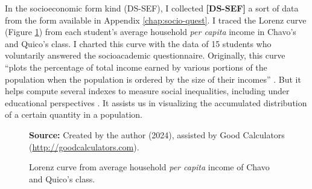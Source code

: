 In the socioeconomic form kind (\acrfull{DS-SEF}), I collected \textbf{[DS-SEF]} a sort of data from the form available in Appendix \ref{chap:socio-quest}. I traced the Lorenz curve (Figure \ref{fig:lorenz-curve-classroom}) from each student's average household \textit{per capita} income in Chavo's and Quico’s class. I charted this curve with the data of 15 students who voluntarily answered the socioacademic questionnaire. Originally, this curve “plots the percentage of total income earned by various portions of the population when the population is ordered by the size of their incomes” \cite{gastwirth:1971}. But it helps compute several indexes to measure social inequalities, including under educational perspectives \cite{thomas:2003}. It assists us in visualizing the accumulated distribution of a certain quantity in a population.

\begin{figure}[ht!]
\centering

\caption{\textmd{Lorenz curve from average household \textit{per capita} income of Chavo and Quico’s class.}}
\label{fig:lorenz-curve-classroom}

\par\medskip\ABNTEXfontereduzida\selectfont\textbf{Source:} Created by the author (2024), assisted by Good Calculators (\url{http://goodcalculators.com}).%
\end{figure}

